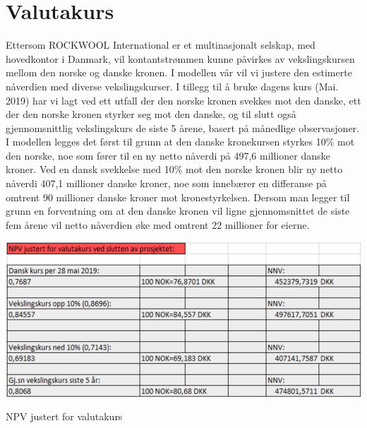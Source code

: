 \section{Valutakurs}
Ettersom ROCKWOOL International er et multinasjonalt selskap, med hovedkontor i Danmark, vil kontantstrømmen kunne påvirkes av vekslingskursen mellom den norske og danske kronen. I modellen vår vil vi justere den estimerte nåverdien med diverse vekslingskurser. I tillegg til å bruke dagens kurs (Mai. 2019) har vi lagt ved ett utfall der den norske kronen svekkes mot den danske, ett der den norske kronen styrker seg mot den danske, og til slutt også gjennomsnittlig vekslingskurs de siste 5 årene, basert på månedlige observasjoner. I modellen legges det først til grunn at den danske kronekursen styrkes 10\% mot den norske, noe som fører til en ny netto nåverdi på 497,6 millioner danske kroner. Ved en dansk svekkelse med 10\% mot den norske kronen blir ny netto nåverdi 407,1 millioner danske kroner, noe som innebærer en differanse på omtrent 90 millioner danske kroner mot kronestyrkelsen. Dersom man legger til grunn en forventning om at den danske kronen vil ligne gjennomsnittet de siste fem årene vil netto nåverdien øke med omtrent 22 millioner for eierne. 


\begin{table}[H]
  \includegraphics[width=\linewidth]{tabeller/NPVvaluta.png}
  \caption{NPV justert for valutakurs}
  \label{tbl:NPVvaluta}
\end{table}